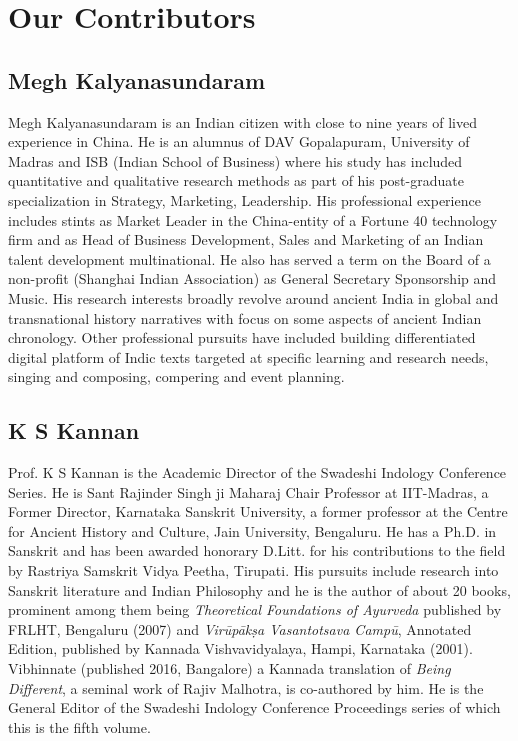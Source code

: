 
\chapter*{Our Contributors }\label{contributors}

\vspace{-1cm}

\section*{Megh Kalyanasundaram}

Megh Kalyanasundaram is an Indian citizen with close to nine years of lived experience in China. He is an alumnus of DAV Gopalapuram, University of Madras and ISB (Indian School of Business) where his study has included quantitative and qualitative research methods as part of his post-graduate specialization in Strategy, Marketing, Leadership. His professional experience includes stints as Market Leader in the China-entity of a Fortune 40 technology firm and as Head of Business Development, Sales and Marketing of an Indian talent development multinational. He also has served a term on the Board of a non-profit (Shanghai Indian Association) as General Secretary Sponsorship and Music. His research interests broadly revolve around ancient India in global and transnational history narratives with focus on some aspects of ancient Indian chronology. Other professional pursuits have included building differentiated digital platform of Indic texts targeted at specific learning and research needs, singing and composing, compering and event planning.

\vspace{-.3cm}

\section*{K S Kannan}

Prof. K S Kannan is the Academic Director of the Swadeshi Indology Conference Series. He is Sant Rajinder Singh ji Maharaj Chair Professor at IIT-Madras, a Former Director, Karnataka Sanskrit University, a former professor at the Centre for Ancient History and Culture, Jain University, Bengaluru. He has a Ph.D. in Sanskrit and has been awarded honorary D.Litt. for his contributions to the field by Rastriya Samskrit Vidya Peetha, Tirupati. His pursuits include research into Sanskrit literature and Indian Philosophy and he is the author of about 20 books, prominent among them being \textit{Theoretical Foundations of Ayurveda} published by FRLHT, Bengaluru (2007) and \textit{Virūpākṣa Vasantotsava Campū}, Annotated Edition, published by Kannada Vishvavidyalaya, Hampi, Karnataka (2001). Vibhinnate (published 2016, Bangalore) a Kannada translation of \textit{Being Different}, a seminal work of Rajiv Malhotra, is co-authored by him. He is the General Editor of the Swadeshi Indology Conference Proceedings series of which this is the fifth volume.

